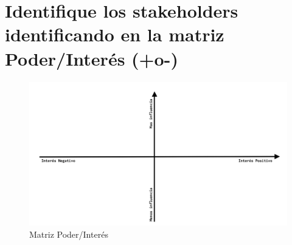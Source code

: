 \documentclass[11pt]{utalcaDoc}
\begin{document}
\section{Identifique los stakeholders identificando en la matriz Poder/Interés (+o-)}

\begin{figure}[!ht]
  \centering
\includegraphics[scale=.3]{tabla.png} 
  \caption{Matriz Poder/Interés}
  \label{FIGURE:MATRIX}
\end{figure}
\end{document}
